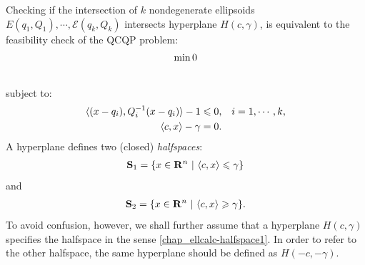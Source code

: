 \documentclass[letterpaper,10pt,english]{sphinxmanual}
\begin{document}
Checking if the intersection of $k$ nondegenerate ellipsoids
$E(q_1,Q_1),\cdots,{\mathcal E}(q_k,Q_k)$ intersects hyperplane
$H(c,\gamma)$, is equivalent to the feasibility check of the QCQP
problem:
\begin{gather}
\begin{split}\min 0\end{split}\notag\\\begin{split}\end{split}\notag
\end{gather}
subject to:
\begin{gather}
\begin{split}\begin{aligned}
\langle (x-q_i),Q_i^{-1}(x-q_i)\rangle - 1 \leqslant0, & & i=1,\cdots,k,\\
\langle c, x\rangle - \gamma = 0. & &\end{aligned}\end{split}\notag
\end{gather}
A hyperplane defines two (closed) \emph{halfspaces}:
\label{chap_ellcalc:equation-halfspace1}\begin{gather}
\begin{split}{\bf S}_1 = \{x\in{\bf R}^n ~|~ \langle c, x\rangle \leqslant\gamma\}\end{split}\label{chap_ellcalc-halfspace1}
\end{gather}
and
\label{chap_ellcalc:equation-halfspace2}\begin{gather}
\begin{split}{\bf S}_2 = \{x\in{\bf R}^n ~|~ \langle c, x\rangle \geqslant\gamma\}.\end{split}\label{chap_ellcalc-halfspace2}
\end{gather}
To avoid confusion, however, we shall further assume that a hyperplane
$H(c,\gamma)$ specifies the halfspace in the sense \eqref{chap_ellcalc-halfspace1}.
In order to refer to the other halfspace, the same hyperplane should be
defined as $H(-c,-\gamma)$.
\end{document}
